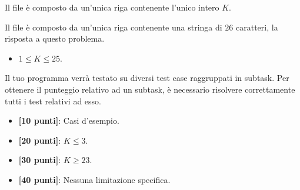 \InputFile
Il file  è composto da un'unica riga contenente l'unico intero $K$.

\OutputFile
Il file \outputfile{} è composto da un'unica riga contenente una stringa di $26$ caratteri, la risposta a questo problema.

\Constraints
\begin{itemize}[nolistsep, itemsep=2mm]
	\item $1 \le K \le 25$.
\end{itemize}

\Scoring
Il tuo programma verrà testato su diversi test case raggruppati in subtask.
Per ottenere il punteggio relativo ad un subtask, è necessario risolvere
correttamente tutti i test relativi ad esso.

\begin{itemize}[nolistsep,itemsep=2mm]
  \item \textbf{ [10 punti]}: Casi d'esempio.
  \item \textbf{ [20 punti]}: $K \le 3$.
  \item \textbf{ [30 punti]}: $K \ge 23$.
  \item \textbf{ [40 punti]}: Nessuna limitazione specifica.
\end{itemize}

\Examples
\begin{example}
%
%
%
\end{example}
